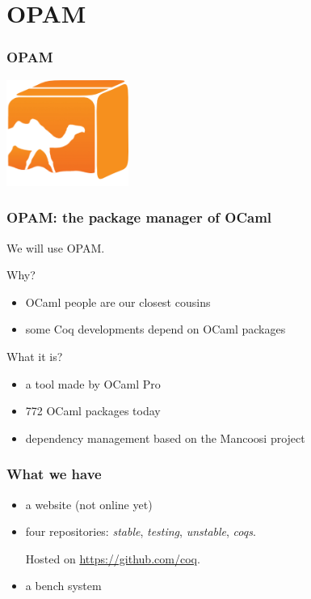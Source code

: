 \documentclass{beamer}
\begin{document}
  \section{OPAM}
  \begin{frame}
    \frametitle{OPAM}
    \begin{center}
      \includegraphics[width=4cm]{images/opam}
    \end{center}
  \end{frame}
  \begin{frame}
    \frametitle{OPAM: the package manager of OCaml}
    We will use OPAM.

    Why?
    \begin{itemize}
      \item OCaml people are our closest cousins
      \item some Coq developments depend on OCaml packages
    \end{itemize}
    What it is?
    \begin{itemize}
      \item a tool made by OCaml Pro
      \item 772 OCaml packages today
      \item dependency management based on the Mancoosi project
    \end{itemize}
  \end{frame}
  \begin{frame}
    \frametitle{What we have}
    \begin{itemize}
      \item a website (not online yet)
      \item four repositories: \emph{stable}, \emph{testing}, \emph{unstable}, \emph{coqs}.

        Hosted on \url{https://github.com/coq}.
      \item a bench system
    \end{itemize}
  \end{frame}
\end{document}
